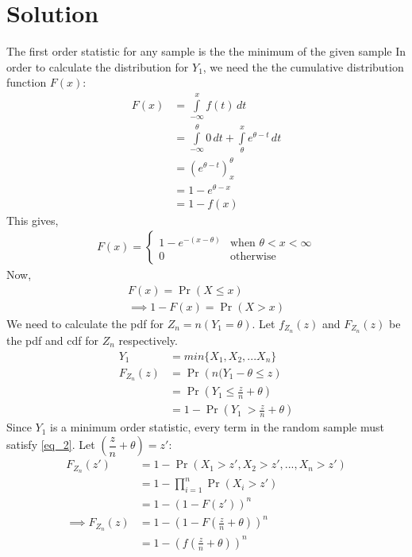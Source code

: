 \documentclass[journal,12pt,twocolumn]{IEEEtran}
\providecommand{\pr}[1]{\ensuremath{\Pr\left(#1\right)}}
\providecommand{\brak}[1]{\ensuremath{\left(#1\right)}}
\theoremstyle{remark}
\numberwithin{equation}{subsection}
\begin{document}
\section{\textbf{Solution}}
The first order statistic for any sample is the the minimum of the given sample 
In order to calculate the distribution for $Y_1$, we need the the cumulative distribution function $F(x)$:\\
\begin{align}
  F(x) &=\displaystyle\int\limits_{-\infty}^{x} f(t) \,dt\\
  &= \displaystyle\int\limits_{-\infty}^{\theta}0\,dt + \displaystyle\int\limits_{\theta}^{x}e^{\theta-t}\,dt\\
  &=\brak{e^{\theta-t}}_{x}^{\theta}\\
  &= 1-e^{\theta-x} \\
  &= 1-f(x) \label{eq_1}
\end{align}
This gives,
\begin{align}
    F(x) = 
    \begin{cases}
    1-e^{-(x-\theta)} &\text{when }\theta<x<\infty\\
    0 &\text{otherwise}
    \end{cases}
\end{align}
Now,
\begin{align}
    F(x) = \pr{X\leq x}\\
    \implies 1-F(x) = \pr{X>x}
\end{align}
We need to calculate the pdf for $Z_n = n(Y_1=\theta)$. Let $f_{Z_n}(z)$ and $F_{Z_n}(z)$ be the pdf and cdf for $Z_n$ respectively.
\begin{align}
    Y_1 &= \textit{min}\{X_1, X_2, ... X_n\}\\
    F_{Z_n}(z) &= \pr{n(Y_1-\theta\leq z}\\
    &= \pr{Y_1\leq \frac{z}{n} +\theta}\\
    &= 1-\pr{Y_1\ > \frac{z}{n} +\theta}\label{eq_2}
\end{align}
Since $Y_1$ is a minimum order statistic, every term in the random sample must satisfy \eqref{eq_2}. Let $\brak{\dfrac{z}{n}+\theta} = z'$:
\begin{align}
    F_{Z_n}(z')&= 1-\pr{X_1>z', X_2>z', ..., X_n>z'}\nonumber\\
    &= 1-\prod_{i=1}^{n}\pr{X_i>z'}\nonumber\\
    &= 1-\brak{1-F(z')}^n\nonumber\\
    \implies F_{Z_n}(z) &= 1-\brak{1-F\brak{\frac{z}{n}+\theta}}^n\label{eq_3}\\
    &=1-\brak{f\brak{\frac{z}{n}+\theta}}^n 
\end{align}
\end{document}
